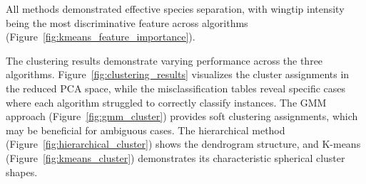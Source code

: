 \documentclass[a4paper,12pt]{report}
\begin{document}
All methods demonstrated effective species separation, with wingtip intensity being the most discriminative feature across algorithms (Figure~\ref{fig:kmeans_feature_importance}).






The clustering results demonstrate varying performance across the three algorithms. Figure~\ref{fig:clustering_results} visualizes the cluster assignments in the reduced PCA space, while the misclassification tables reveal specific cases where each algorithm struggled to correctly classify instances. The GMM approach (Figure~\ref{fig:gmm_cluster}) provides soft clustering assignments, which may be beneficial for ambiguous cases. The hierarchical method (Figure~\ref{fig:hierarchical_cluster}) shows the dendrogram structure, and K-means (Figure~\ref{fig:kmeans_cluster}) demonstrates its characteristic spherical cluster shapes.
\end{document}
